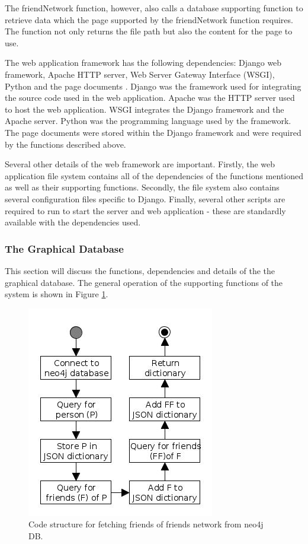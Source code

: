\documentclass[12pt,onecolumn]{article}
\begin{document}
	The friendNetwork function, however, also calls a database supporting function to retrieve data which the page supported by the friendNetwork function requires. The function not only returns the file path but also the content for the page to use.
	
	The web application framework has the following dependencies: Django web framework, Apache HTTP server, Web Server Gateway Interface (WSGI), Python  and the page documents \cite{django, apache, wsgi}. Django was the framework used for integrating the source code used in the web application. Apache was the HTTP server used to host the web application. WSGI integrates the Django framework and the Apache server. Python was the programming language used by the framework. The page documents were stored within the Django framework and were required by the functions described above. 
	
	Several other details of the web framework are important. Firstly, the web application file system contains all of the dependencies of the functions mentioned as well as their supporting functions. Secondly, the file system also contains several configuration files specific to Django. Finally, several other scripts are required to run to start the server and web application - these are standardly available with the dependencies used.
	
	\subsubsection{The Graphical Database}
	This section will discuss the functions, dependencies and details of the the graphical database. The general operation of the supporting functions of the system is shown in Figure \ref{fig:db}.
	
	\begin{figure} [htb]
		\centering
		\includegraphics[scale=1]{neo4jdb}
		\caption{Code structure for fetching friends of friends network from neo4j DB.} \label{fig:db}
	\end{figure}
	
\end{document}

